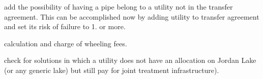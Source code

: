 \begin{DoxyRefList}
add the possibility of having a pipe belong to a utility not in the transfer agreement. This can be accomplished now by adding utility to transfer agreement and set its risk of failure to 1. or more. 

calculation and charge of wheeling fees.  
\item[\label{todo__todo000006}%
\Hypertarget{todo__todo000006}%
Member \mbox{\hyperlink{classTriangle_a9e95039d098fd61cce1a830b85ed7004}{Triangle\+:\+:function\+Evaluation}} (double $\ast$vars, double $\ast$objs, double $\ast$consts) override]check for solutions in which a utility does not have an allocation on Jordan Lake (or any generic lake) but still pay for joint treatment infrastructure). 
\end{DoxyRefList}